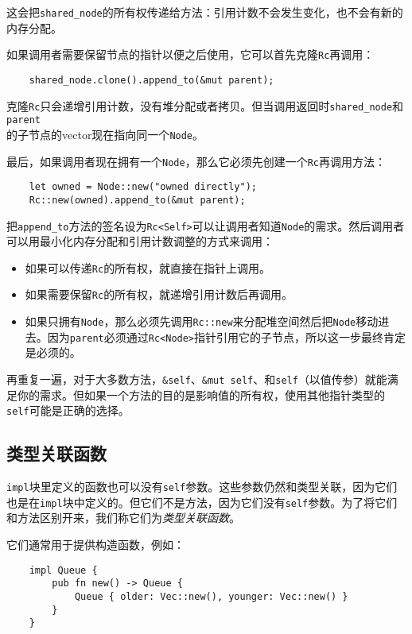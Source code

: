 这会把\texttt{shared\_node}的所有权传递给方法：引用计数不会发生变化，也不会有新的内存分配。

如果调用者需要保留节点的指针以便之后使用，它可以首先克隆\texttt{Rc}再调用：
\begin{verbatim}
    shared_node.clone().append_to(&mut parent);
\end{verbatim}

克隆\texttt{Rc}只会递增引用计数，没有堆分配或者拷贝。但当调用返回时\texttt{shared\_node}和\texttt{parent}\\
的子节点的vector现在指向同一个\texttt{Node}。

最后，如果调用者现在拥有一个\texttt{Node}，那么它必须先创建一个\texttt{Rc}再调用方法：
\begin{verbatim}
    let owned = Node::new("owned directly");
    Rc::new(owned).append_to(&mut parent);
\end{verbatim}

把\texttt{append\_to}方法的签名设为\texttt{Rc<Self>}可以让调用者知道\texttt{Node}的需求。然后调用者可以用最小化内存分配和引用计数调整的方式来调用：
\begin{itemize}
    \item 如果可以传递\texttt{Rc}的所有权，就直接在指针上调用。
    \item 如果需要保留\texttt{Rc}的所有权，就递增引用计数后再调用。
    \item 如果只拥有\texttt{Node}，那么必须先调用\texttt{Rc::new}来分配堆空间然后把\texttt{Node}移动进去。因为\texttt{parent}必须通过\texttt{Rc<Node>}指针引用它的子节点，所以这一步最终肯定是必须的。
\end{itemize}

再重复一遍，对于大多数方法，\texttt{\&self}、\texttt{\&mut self}、和\texttt{self}（以值传参）就能满足你的需求。但如果一个方法的目的是影响值的所有权，使用其他指针类型的\texttt{self}可能是正确的选择。

\subsection{类型关联函数}
\texttt{impl}块里定义的函数也可以没有\texttt{self}参数。这些参数仍然和类型关联，因为它们也是在\texttt{impl}块中定义的。但它们不是方法，因为它们没有\texttt{self}参数。为了将它们和方法区别开来，我们称它们为\emph{类型关联函数}。

它们通常用于提供构造函数，例如：
\begin{verbatim}
    impl Queue {
        pub fn new() -> Queue {
            Queue { older: Vec::new(), younger: Vec::new() }
        }
    }
\end{verbatim}

